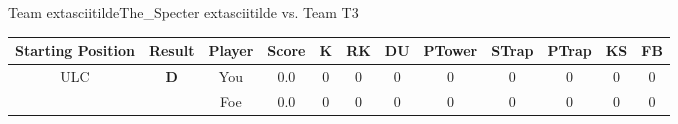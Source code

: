 \documentclass[a4paper,12pt]{article}
\begin{document}
  \vspace*{2em}
  \par {\large {\color{Gray} Team} 	extasciitildeThe\_Specter	extasciitilde {\color{Gray}
      vs. Team} T3}
  \newline
  \begin{tabular}[t]{| c | c | c | c | c | c | c | c | c | c | c | c
      |}
    \hline
    Starting Position & \textbf{Result} & Player & \textbf{Score} & K & RK & DU & PTower & STrap & PTrap & KS & FB \\
    
      
                      
      
                      
      
                      
      
                      
      
                      
      
                      
      
                      
      
                      
      
                      
      
                      
      
        \hline
        \multirow{2}{*}{  ULC  } &
              \multirow{2}{*}{  
                  \textbf{D}  } & 
                    \cellcolor{yellow!25} You & \cellcolor{yellow!25} 0.0 & \cellcolor{yellow!25} 0 &
                    \cellcolor{yellow!25} 0 & \cellcolor{yellow!25} 0 & \cellcolor{yellow!25} 0 &
                    \cellcolor{yellow!25} 0 & \cellcolor{yellow!25} 0 & \cellcolor{yellow!25} 0 &
                    \cellcolor{yellow!25} 0 \\
                    \cline{3-12}
                    & & \cellcolor{red!15} Foe & \cellcolor{red!15} 0.0 & \cellcolor{red!15} 0 & \cellcolor{red!15}
                    0 & \cellcolor{red!15} 0
                    & \cellcolor{red!15} 0 & \cellcolor{red!15}
                    0 & \cellcolor{red!15} 0 
                    & \cellcolor{red!15} 0 & \cellcolor{red!15}
                    0 \\
                    
                      
      
                      
      
                      
      

\end{tabular}
\end{document}
